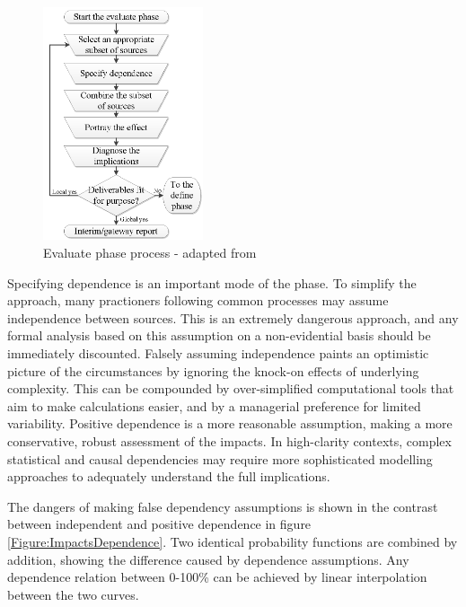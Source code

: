 \begin{figure}[!h]
  \centering
    \includegraphics[width = 0.42\textwidth]{./Figures/Evaluate.png} 
\caption{Evaluate phase process - adapted from \cite{chapman}}
\label{Figure:Evaluate}
\end{figure}

Specifying dependence is an important mode of the phase.
To simplify the approach, many practioners following common processes may assume independence between sources.
This is an extremely dangerous approach, and any formal analysis based on this assumption on a non-evidential basis should be immediately discounted.
Falsely assuming independence paints an optimistic picture of the circumstances by ignoring the knock-on effects of underlying complexity.
This can be compounded by over-simplified computational tools that aim to make calculations easier, and by a managerial preference for limited variability. 
Positive dependence is a more reasonable assumption, making a more conservative, robust assessment of the impacts. 
In high-clarity contexts, complex statistical and causal dependencies may require more sophisticated modelling approaches to adequately understand the full implications.

The dangers of making false dependency assumptions is shown in the contrast between independent and positive dependence in figure \ref{Figure:ImpactsDependence}.
Two identical probability functions are combined by addition, showing the difference caused by dependence assumptions.
Any dependence relation between 0-100\% can be achieved by linear interpolation between the two curves.

